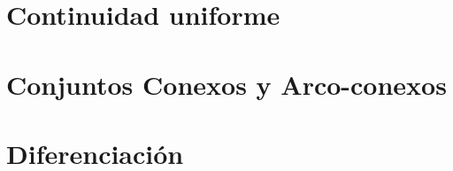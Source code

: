 \section{Continuidad uniforme}

\section{Conjuntos Conexos y Arco-conexos}

\section{Diferenciación}
